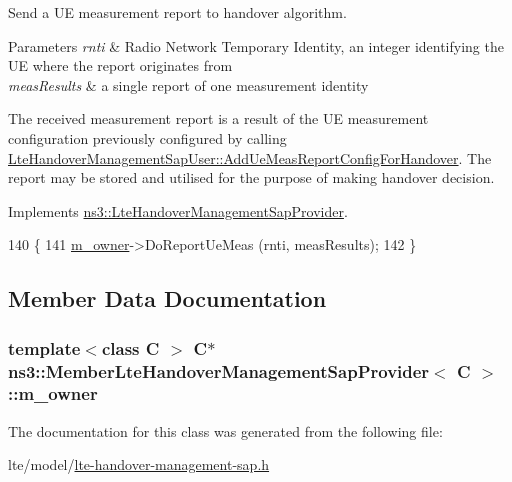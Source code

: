 Send a UE measurement report to handover algorithm. 


\begin{DoxyParams}{Parameters}
{\em rnti} & Radio Network Temporary Identity, an integer identifying the UE where the report originates from \\
\hline
{\em meas\+Results} & a single report of one measurement identity\\
\hline
\end{DoxyParams}
The received measurement report is a result of the UE measurement configuration previously configured by calling \hyperlink{classns3_1_1LteHandoverManagementSapUser_a80f34ec0e586b42547210c1741b4f980}{Lte\+Handover\+Management\+Sap\+User\+::\+Add\+Ue\+Meas\+Report\+Config\+For\+Handover}. The report may be stored and utilised for the purpose of making handover decision. 

Implements \hyperlink{classns3_1_1LteHandoverManagementSapProvider_a5daca6a055e4f8794f7f1e8ba1077b15}{ns3\+::\+Lte\+Handover\+Management\+Sap\+Provider}.


\begin{DoxyCode}
140 \{
141   \hyperlink{classns3_1_1MemberLteHandoverManagementSapProvider_aed1d12dd32801f27234f651f718b1b20}{m\_owner}->DoReportUeMeas (rnti, measResults);
142 \}
\end{DoxyCode}


\subsection{Member Data Documentation}
\subsubsection[{\texorpdfstring{m\+\_\+owner}{m_owner}}]{\setlength{\rightskip}{0pt plus 5cm}template$<$class C $>$ {\bf C}$\ast$ {\bf ns3\+::\+Member\+Lte\+Handover\+Management\+Sap\+Provider}$<$ {\bf C} $>$\+::m\+\_\+owner\hspace{0.3cm}{\ttfamily [private]}}\hypertarget{classns3_1_1MemberLteHandoverManagementSapProvider_aed1d12dd32801f27234f651f718b1b20}{}\label{classns3_1_1MemberLteHandoverManagementSapProvider_aed1d12dd32801f27234f651f718b1b20}


The documentation for this class was generated from the following file\+:\begin{DoxyCompactItemize}
\item 
lte/model/\hyperlink{lte-handover-management-sap_8h}{lte-\/handover-\/management-\/sap.\+h}\end{DoxyCompactItemize}
